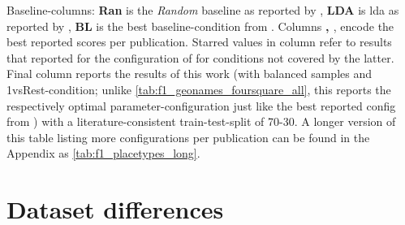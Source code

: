 \begin{table}[H]
{	Baseline-columns: \textbf{Ran} is the \textit{Random} baseline as reported by \cite{Alshaikh2020}, \textbf{LDA} is \acrshort{lda} as reported by \cite{Ager2018}, \textbf{BL} is the best baseline-condition from \cite{Derrac2015}. \hspace{1ex}
	Columns \textbf{\cite{Derrac2015}, \cite{Ager2018}}, \textbf{\cite{Alshaikh2020}} encode the best reported scores per publication. Starred values in column \textbf{\cite{Derrac2015}} refer to results that \cite{Ager2018} reported for the configuration of \cite{Derrac2015} for conditions not covered by the latter. Final column reports the results of this work (with balanced samples and 1vsRest-condition; unlike \autoref{tab:f1_geonames_foursquare_all}, this reports the respectively optimal parameter-configuration just like the best reported config from \mainalgos) with a literature-consistent train-test-split of 70-30. A longer version of this table listing more configurations per publication can be found in the Appendix as \autoref{tab:f1_placetypes_long}.}
	\label{tab:f1_mainalgos_me_short}
\end{table}





\section{Dataset differences} %
\label{sec:results_datasetdiffs}


